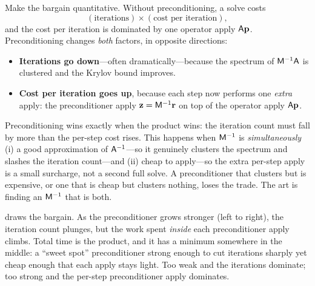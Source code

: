 Make the bargain quantitative. Without preconditioning, a solve costs
\[
  (\text{iterations}) \times (\text{cost per iteration}),
\]
and the cost per iteration is dominated by one operator apply $\mathsf{A}\mathbf{p}$. Preconditioning
changes \emph{both} factors, in opposite directions:

\begin{itemize}[nosep]
  \item \textbf{Iterations go down}---often dramatically---because the spectrum of
  $\mathsf{M}^{-1}\mathsf{A}$ is clustered and the Krylov bound improves.
  \item \textbf{Cost per iteration goes up}, because each step now performs one
  \emph{extra} apply: the preconditioner apply $\mathbf{z}=\mathsf{M}^{-1}\mathbf{r}$ on top of the
  operator apply $\mathsf{A}\mathbf{p}$.
\end{itemize}

\begin{keyidea}
Preconditioning wins exactly when the product wins: the iteration count must fall by
more than the per-step cost rises. This happens when $\mathsf{M}^{-1}$ is
\emph{simultaneously} (i) a good approximation of $\mathsf{A}^{-1}$---so it genuinely
clusters the spectrum and slashes the iteration count---and (ii) cheap to apply---so the
extra per-step apply is a small surcharge, not a second full solve. A preconditioner
that clusters but is expensive, or one that is cheap but clusters nothing, loses the
trade. The art is finding an $\mathsf{M}^{-1}$ that is both.
\end{keyidea}

 draws the bargain. As the preconditioner grows stronger (left to
right), the iteration count plunges, but the work spent \emph{inside} each preconditioner
apply climbs. Total time is the product, and it has a minimum somewhere in the middle: a
``sweet spot'' preconditioner strong enough to cut iterations sharply yet cheap enough
that each apply stays light. Too weak and the iterations dominate; too strong and the
per-step preconditioner apply dominates.

